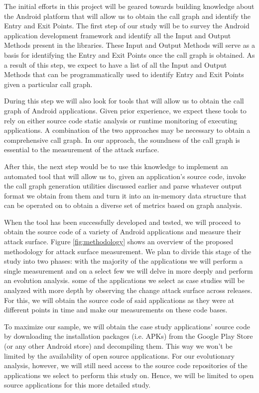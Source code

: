 \documentclass[conference]{IEEEtran}
\begin{document}
The initial efforts in this project will be geared towards building knowledge about the Android platform that will allow us to obtain the call graph and identify the Entry and Exit Points. The first step of our study will be to survey the Android application development framework and identify all the Input and Output Methods present in the libraries. These Input and Output Methods will serve as a basis for identifying the Entry and Exit Points once the call graph is obtained. As a result of this step, we expect to have a list of all the Input and Output Methods that can be programmatically used to identify Entry and Exit Points given a particular call graph.

During this step we will also look for tools that will allow us to obtain the call graph of Android applications. Given prior experience, we expect these tools to rely on either source code static analysis or runtime monitoring of executing applications. A combination of the two approaches may be necessary to obtain a comprehensive call graph. In our approach, the soundness of the call graph is essential to the measurement of the attack surface.

After this, the next step would be to use this knowledge to implement an automated tool that will allow us to, given an application's source code, invoke the call graph generation utilities discussed earlier and parse whatever output format we obtain from them and turn it into an in-memory data structure that can be operated on to obtain a diverse set of metrics based on graph analysis.

When the tool has been successfully developed and tested, we will proceed to obtain the source code of a variety of Android applications and measure their attack surface. Figure \ref{fig:methodology} shows an overview of the proposed methodology for attack surface measurement. We plan to divide this stage of the study into two phases: with the majority of the applications we will perform a single measurement and on a select few we will delve in more deeply and perform an evolution analysis. some of the applications we select as case studies will be analyzed with more depth by observing the change attack surface across releases. For this, we will obtain the source code of said applications as they were at different points in time and make our measurements on these code bases.

To maximize our sample, we will obtain the case study applications' source code by downloading the installation packages (i.e. APKs) from the Google Play Store (or any other Android store) and decompiling them. This way we won't be limited by the availability of open source applications. For our evolutionary analysis, however, we will still need access to the source code repositories of the applications we select to perform this study on. Hence, we will be limited to open source applications for this more detailed study.
\end{document}
